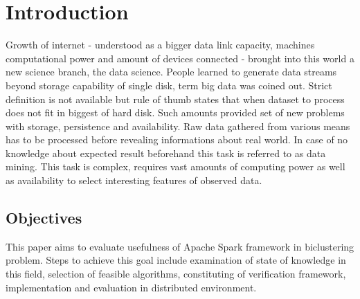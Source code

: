 \chapter{Introduction}
\label{cha:introduction}




Growth of internet - understood as a bigger data link capacity, machines computational power and amount of devices connected - brought into this world a new science branch, the data science. People learned to generate data streams beyond storage capability of single disk, term big data was coined out. Strict definition is not available but rule of thumb states that when dataset to process does not fit in biggest of hard disk. Such amounts provided set of new problems with storage, persistence and availability.
Raw data gathered from various means has to be processed before revealing informations about real world. In case of no knowledge about expected result beforehand this task is referred to as data mining. This task is complex, requires vast amounts of computing power as well as availability to select interesting features of observed data. 


\section{Objectives}
This paper aims to evaluate usefulness of Apache Spark framework in biclustering problem. Steps to achieve this goal include examination of state of knowledge in this field, selection of feasible algorithms, constituting of verification framework, implementation and evaluation in distributed environment.

